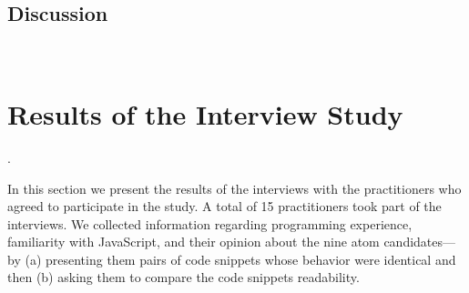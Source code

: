 
\subsection{Discussion}







\


\section{Results of the Interview Study}
\label{sec:interview-results}

.

In this section we present the results of the 
interviews with the practitioners who agreed to participate
in the study. A total of 15 practitioners
took part of the interviews.
We collected information regarding programming
experience, familiarity with JavaScript, and their opinion
about the {\color{red}nine} atom candidates---by
(a) presenting them pairs of code snippets whose behavior were identical
and then (b) asking them to compare the code snippets readability.



